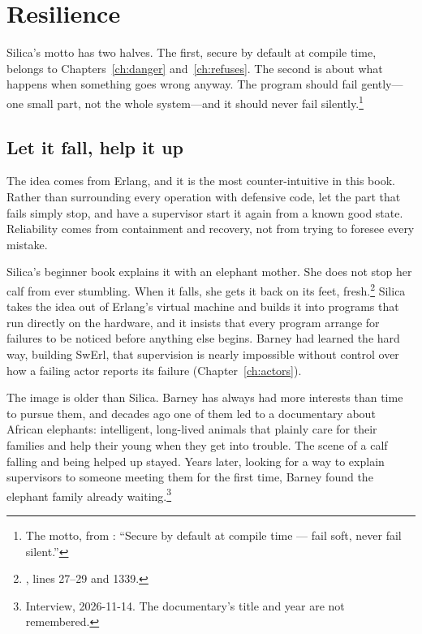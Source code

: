 \chapter{Resilience}
\label{ch:failsoft}

Silica's motto has two halves. The first, secure by default at compile time,
belongs to Chapters~\ref{ch:danger} and~\ref{ch:refuses}. The second is about
what happens when something goes wrong anyway. The program should fail
gently---one small part, not the whole system---and it should never fail
silently.\footnote{The motto, from : ``Secure by default
at compile time --- fail soft, never fail silent.''}

\section{Let it fall, help it up}

The idea comes from Erlang, and it is the most counter-intuitive in this book.
Rather than surrounding every operation with defensive code, let the part that
fails simply stop, and have a supervisor start it again from a known good
state. Reliability comes from containment and recovery, not from trying to
foresee every mistake.

Silica's beginner book explains it with an elephant mother. She does not stop
her calf from ever stumbling. When it falls, she gets it back on its feet,
fresh.\footnote{, lines 27--29 and 1339.}
Silica takes the idea out of Erlang's virtual machine and builds it into
programs that run directly on the hardware, and it insists that every program
arrange for failures to be noticed before anything else begins. Barney had
learned the hard way, building SwErl, that supervision is nearly impossible
without control over how a failing actor reports its failure
(Chapter~\ref{ch:actors}).

The image is older than Silica. Barney has always had more interests than time
to pursue them, and decades ago one of them led to a documentary about African
elephants: intelligent, long-lived animals that plainly care for their families
and help their young when they get into trouble. The scene of a calf falling and
being helped up stayed. Years later, looking for a way to explain supervisors to
someone meeting them for the first time, Barney found the elephant family
already waiting.\footnote{Interview, 2026-11-14. The documentary's title and
year are not remembered.}

